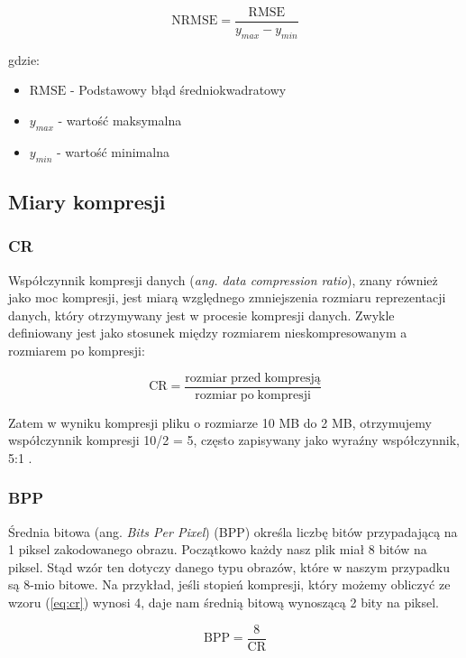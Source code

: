 \documentclass{article}
\begin{document}
\begin{equation}
    \mathrm{NRMSE} = \frac{\mathrm{RMSE}}{y_{max} - y_{min}}
\end{equation}

gdzie:
\begin{itemize}[label=]
  \item $\mathrm{RMSE}$ - Podstawowy błąd średniokwadratowy
  \item $y_{max}$ - wartość maksymalna
  \item $y_{min}$ - wartość minimalna
\end{itemize}

\subsection{Miary kompresji}

\subsubsection{CR}

Współczynnik kompresji danych (\textit{ang. data compression ratio}), znany również jako moc kompresji, jest miarą względnego zmniejszenia rozmiaru reprezentacji danych, który otrzymywany jest w procesie kompresji danych. Zwykle definiowany jest jako stosunek między rozmiarem nieskompresowanym a rozmiarem po kompresji:

\begin{equation}
    \mathrm{CR} = \frac{\mathrm{rozmiar\;przed\;kompresją}}{\mathrm{rozmiar\;po\;kompresji}}
  \label{eq:cr}
\end{equation}

Zatem w wyniku kompresji pliku o rozmiarze 10 MB do 2 MB, otrzymujemy współczynnik kompresji 10/2 = 5, często zapisywany jako wyraźny współczynnik, 5:1 \cite{compression_ratio}.

\subsubsection{BPP}

Średnia bitowa (ang. \emph{Bits Per Pixel}) (BPP) określa liczbę bitów przypadającą na 1 piksel zakodowanego obrazu. Początkowo każdy nasz plik miał 8 bitów na piksel. Stąd wzór ten dotyczy danego typu obrazów, które w naszym przypadku są 8-mio bitowe. Na przykład, jeśli stopień kompresji, który możemy obliczyć ze wzoru (\ref{eq:cr}) wynosi 4, daje nam średnią bitową wynoszącą 2 bity na piksel.

\begin{equation}
    \textrm{BPP} = \frac{8}{\textrm{CR}}
\end{equation}
\end{document}
